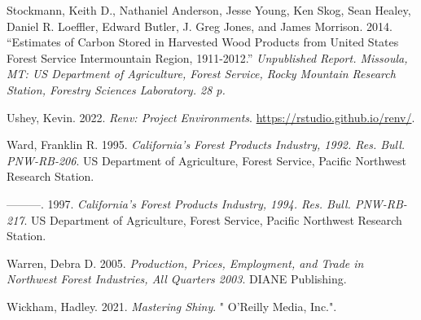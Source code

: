 \documentclass[
  openany]{book}
\newlength{\cslhangindent}
\newlength{\cslentryspacingunit} %
\newenvironment{CSLReferences}[2] %
 {%
  \setlength{\parindent}{0pt}
  \ifodd #1
  \let\oldpar\par
  \def\par{\hangindent=\cslhangindent\oldpar}
  \fi
  \setlength{\parskip}{#2\cslentryspacingunit}
 }%
 {}
\begin{document}
\begin{CSLReferences}{1}{0}
\leavevmode{}%
Stockmann, Keith D., Nathaniel Anderson, Jesse Young, Ken Skog, Sean
Healey, Daniel R. Loeffler, Edward Butler, J. Greg Jones, and James
Morrison. 2014. {``Estimates of Carbon Stored in Harvested Wood Products
from United States Forest Service Intermountain Region, 1911-2012.''}
\emph{Unpublished Report. Missoula, MT: US Department of Agriculture,
Forest Service, Rocky Mountain Research Station, Forestry Sciences
Laboratory. 28 p.}

\leavevmode{}%
Ushey, Kevin. 2022. \emph{Renv: Project Environments}.
\url{https://rstudio.github.io/renv/}.

\leavevmode{}%
Ward, Franklin R. 1995. \emph{California's Forest Products Industry,
1992. Res. Bull. PNW-RB-206}. US Department of Agriculture, Forest
Service, Pacific Northwest Research Station.

\leavevmode{}%
---------. 1997. \emph{California's Forest Products Industry, 1994. Res.
Bull. PNW-RB-217}. US Department of Agriculture, Forest Service, Pacific
Northwest Research Station.

\leavevmode{}%
Warren, Debra D. 2005. \emph{Production, Prices, Employment, and Trade
in Northwest Forest Industries, All Quarters 2003}. DIANE Publishing.

\leavevmode{}%
Wickham, Hadley. 2021. \emph{Mastering Shiny}. " O'Reilly Media, Inc.".

\end{CSLReferences}

\backmatter
\end{document}
